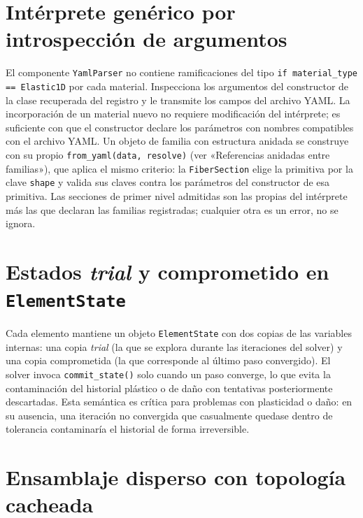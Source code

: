 \documentclass[11pt,oneside]{report}
\begin{document}
\section{Intérprete genérico por introspección de argumentos}

El componente \texttt{YamlParser} no contiene ramificaciones del tipo \texttt{if material\_\allowbreak{}type == \textquotedbl{}Elastic1D\textquotedbl{}} por cada material. Inspecciona los argumentos del constructor de la clase recuperada del registro y le transmite los campos del archivo YAML. La incorporación de un material nuevo no requiere modificación del intérprete; es suficiente con que el constructor declare los parámetros con nombres compatibles con el archivo YAML. Un objeto de familia con estructura anidada se construye con su propio \texttt{from\_\allowbreak{}yaml(data, resolve)} (ver «Referencias anidadas entre familias»), que aplica el mismo criterio: la \texttt{FiberSection} elige la primitiva por la clave \texttt{shape} y valida sus claves contra los parámetros del constructor de esa primitiva. Las secciones de primer nivel admitidas son las propias del intérprete más las que declaran las familias registradas; cualquier otra es un error, no se ignora.

\section{Estados \textit{trial} y comprometido en \texttt{ElementState}}

Cada elemento mantiene un objeto \texttt{ElementState} con dos copias de las variables internas: una copia \textit{trial} (la que se explora durante las iteraciones del solver) y una copia comprometida (la que corresponde al último paso convergido). El solver invoca \texttt{commit\_state()} solo cuando un paso converge, lo que evita la contaminación del historial plástico o de daño con tentativas posteriormente descartadas. Esta semántica es crítica para problemas con plasticidad o daño: en su ausencia, una iteración no convergida que casualmente quedase dentro de tolerancia contaminaría el historial de forma irreversible.

\section{Ensamblaje disperso con topología cacheada}
\end{document}
